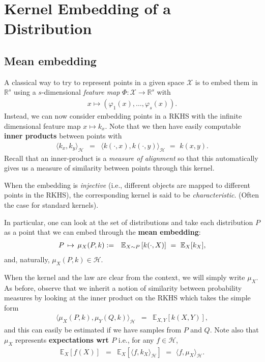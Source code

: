 \section{Kernel Embedding of a Distribution}
\subsection{Mean embedding}
A classical way to try to represent points in a given space $\mathcal X$ is to embed them in $\mathbb R^s$ using a $s$-dimensional \emph{feature map} $\Phi:\mathcal X\to \mathbb R^s$ with
\begin{eqnarray}
	x \mapsto (\varphi_1(x),\dots,\varphi_s(x)).\nonumber
\end{eqnarray}
Instead, we can now consider embedding points in a RKHS with the infinite dimensional feature map $x\mapsto k_x$. Note that we then have easily computable \textbf{inner products} between points with
\begin{eqnarray}
	\langle k_x,k_y\rangle_{\mathcal H} &=& \langle k(\cdot,x),k(\cdot,y)\rangle_{\mathcal H} \,\,=\,\, k(x,y).
\end{eqnarray}
Recall that an inner-product is a \emph{measure of alignment} so that this automatically gives us a measure of similarity between points through this kernel.

When the embedding is \emph{injective} (i.e., different objects are mapped to different points in the RKHS), the corresponding kernel is said to be \emph{characteristic}. (Often the case for standard kernels).

\begin{ybox}
In particular, one can look at the set of distributions and take each distribution $P$ as a point that we can embed through the \textbf{mean embedding}:
\begin{eqnarray}
	P \,\mapsto\, \mu_X(P,k) &:=& \mathbb E_{X\sim P}\left[ k(\cdot,X) \right] \,\,=\,\,\mathbb E_{X}[k_{X}],
\end{eqnarray}
and, naturally, $\mu_X(P,k)\in\mathcal H$.
\end{ybox}
When the kernel and the law are clear from the context, we will simply write $\mu_{X}$. As before, observe that we inherit a notion of similarity between probability measures by looking at the inner product on the RKHS which takes the simple form
\begin{eqnarray}
	\langle \mu_X(P,k),\mu_Y(Q,k)\rangle_{\mathcal H} &=& \mathbb E_{X,Y}\left[k(X,Y)\right],
\end{eqnarray}
and this can easily be estimated if we have samples from $P$ and $Q$. Note also that $\mu_X$ represents \textbf{expectations wrt $P$} i.e., for any $f\in\mathcal H$,
\begin{eqnarray}
	\mathbb E_{X}[f(X)] &=& \mathbb E_X\left[\langle f, k_{X}\rangle_{\mathcal H}\right] \,\,=\,\, \langle f,\mu_X\rangle_{\mathcal H}.
\end{eqnarray}

